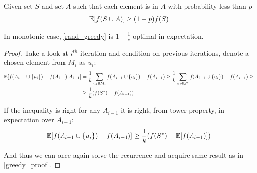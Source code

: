 \begin{prop}
	Given set $S$ and set $A$ such that each element is in $A$ with probability less than $p$
	\begin{align}
	\mathbb{E} \qty[f(S\cup A)] \geq (1-p)f(S)
	\end{align}
\end{prop}
\begin{theorem}
	In monotonic case, \cref{rand_greedy} is $1-\frac{1}{e}$ optimal in expectation.
	\begin{proof}
		Take a look at $i^{th}$ iteration and condition on previous iterations, denote a chosen element from $M_i$ as $u_i$:
		\begin{align}
		\mathbb{E} \qty[f(A_{i-1} \cup \qty{u_i}) - f(A_{i-1}) | A_{i-1} ] &= \frac{1}{k} \sum_{u_i \in M_i} f(A_{i-1} \cup \qty{u_i}) - f(A_{i-1}) \geq \frac{1}{k} \sum_{u_i \in S^*} f(A_{i-1} \cup \qty{u_i}) - f(A_{i-1}) \geq\\&\geq \frac{1}{k} ( f(S^*) - f(A_{i-1}))
		\end{align}
		
		If the inequality is right for any $A_{i-1}$ it is right, from tower property, in expectation over $A_{i-1}$:
		\begin{align}
		\mathbb{E} \qty[f(A_{i-1} \cup \qty{u_i}) - f(A_{i-1}) ] \geq 	\frac{1}{k} ( f(S^*) - \mathbb{E} \qty[ f(A_{i-1})] )
		\end{align}
		
		And thus we can once again solve the recurrence and acquire same result as in \cref{greedy_proof}.
	\end{proof}
\end{theorem}
